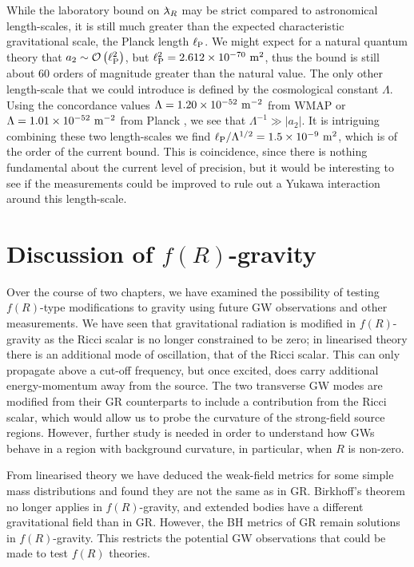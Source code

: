 While the laboratory bound on $\lambdabar_R$ may be strict compared to astronomical length-scales, it is still much greater than the expected characteristic gravitational scale, the Planck length $\ell_\mathrm{P}$. We might expect for a natural quantum theory that $a_2 \sim \mathcal{O}\left({\ell_\mathrm{P}^2}\right)$, but $\ell_\mathrm{P}^2 = 2.612 \times 10^{-70}~\mathrm{m^2}$, thus the bound is still about $60$ orders of magnitude greater than the natural value. The only other length-scale that we could introduce is defined by the cosmological constant $\Lambda$. Using the concordance values $\Lambda = 1.20 \times 10^{-52}~\mathrm{m^{-2}}$ from WMAP \citep{Bennett2012, Hinshaw2012} or $\Lambda = 1.01 \times 10^{-52}~\mathrm{m^{-2}}$ from Planck \citep{Ade2013a,Ade2013b, Hinshaw2012}, we see that $\Lambda^{-1} \gg |a_2|$. It is intriguing combining these two length-scales we find ${\ell_\mathrm{P}}/{\Lambda^{1/2}} = 1.5 \times 10^{-9}~\mathrm{m^2}$, which is of the order of the current bound. This is coincidence, since there is nothing fundamental about the current level of precision, but it would be interesting to see if the measurements could be improved to rule out a Yukawa interaction around this length-scale. %

\section{Discussion of $f(R)$-gravity}\label{sec:f_Discuss}

Over the course of two chapters, we have examined the possibility of testing $f(R)$-type modifications to gravity using future GW observations and other measurements. We have seen that gravitational radiation is modified in $f(R)$-gravity as the Ricci scalar is no longer constrained to be zero; in linearised theory there is an additional mode of oscillation, that of the Ricci scalar. This can only propagate above a cut-off frequency, but once excited, does carry additional energy-momentum away from the source. The two transverse GW modes are modified from their GR counterparts to include a contribution from the Ricci scalar, which would allow us to probe the curvature of the strong-field source regions. However, further study is needed in order to understand how GWs behave in a region with background curvature, in particular, when $R$ is non-zero.

From linearised theory we have deduced the weak-field metrics for some simple mass distributions and found they are not the same as in GR. Birkhoff's theorem no longer applies in $f(R)$-gravity, and extended bodies have a different gravitational field than in GR. However, the BH metrics of GR remain solutions in $f(R)$-gravity. This restricts the potential GW observations that could be made to test $f(R)$ theories.

